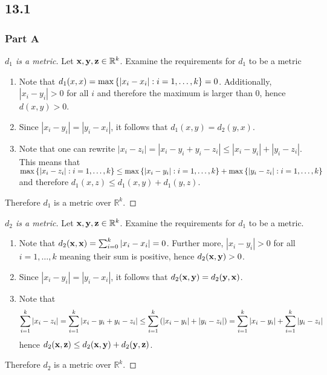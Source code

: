 \documentclass[12pt,titlepage]{extarticle}
\begin{document}
\subsection*{13.1}
\subsubsection*{Part A}
\begin{proof}[$d_1$ is a metric]
    Let $\vb{x},\vb{y},\vb{z} \in \mathbb{R}^k$. Examine the requirements for $d_1$ to be a metric
    \begin{enumerate}
        \item %
            Note that $d_1(x,x) = \max\qty{|x_i - x_i| : i = 1,\ldots,k} = 0$. Additionally, $|x_i - y_i| > 0$ for all $i$ and therefore the maximum is larger than $0$, hence $d(x,y) > 0$.
        \item %
            Since $|x_i - y_i| = |y_i - x_i|$, it follows that $d_1(x,y) = d_2(y,x)$.
        \item %
            Note that one can rewrite $|x_i - z_i| = |x_i - y_i + y_i - z_i| \leq |x_i - y_i| + |y_i - z_i|$. This means that $\max\qty{|x_i - z_i| : i = 1,\ldots,k} \leq \max\qty{|x_i - y_i| : i = 1,\ldots,k} + \max\qty{|y_i - z_i| : i=1,\ldots,k}$ and therefore $d_1(x,z) \leq d_1(x,y) + d_1(y,z)$.
    \end{enumerate}
    Therefore $d_1$ is a metric over $\mathbb{R}^k$.
\end{proof}

\begin{proof}[$d_2$ is a metric]
    Let $\vb{x},\vb{y},\vb{z} \in \mathbb{R}^k$. Examine the requirements for $d_1$ to be a metric.
    \begin{enumerate}
        \item %
            Note that $d_2(\vb{x}, \vb{x}) = \sum_{i=0}^k |x_i - x_i| = 0$. Further more, $|x_i - y_i| > 0$ for all $i = 1,\ldots,k$ meaning their sum is positive, hence $d_2(\vb{x}, \vb{y}) > 0$.
        \item %
            Since $|x_i - y_i| = |y_i - x_i|$, it follows that $d_2(\vb{x}, \vb{y}) = d_2(\vb{y}, \vb{x})$.
        \item %
            Note that
            \[
                \sum_{i=1}^k |x_i - z_i| = \sum_{i=1}^k |x_i - y_i + y_i - z_i| \leq \sum_{i=1}^k \qty(|x_i - y_i| + |y_i - z_i|) = \sum_{i=1}^k |x_i - y_i| + \sum_{i=1}^k |y_i - z_i|
            \]
            hence $d_2(\vb{x}, \vb{z}) \leq d_2(\vb{x}, \vb{y}) + d_2(\vb{y}, \vb{z})$.
    \end{enumerate}
    Therefore $d_2$ is a metric over $\mathbb{R}^k$.
\end{proof}
\end{document}
